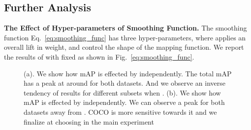 \documentclass[runningheads]{llncs}
\begin{document}
\begin{table}[t]
    \centering
    \caption{
    	Experimental results on re-sampling combined with several re-weighting techniques. CB loss with focal is reported by~\cite{cui2019cb} to perform better, so all the other techniques are enhanced with focal loss for fair comparison
    }
    \label{table:RS_plus_RW}
   \end{table} 
\subsection{Further Analysis}

\noindent\textbf{The Effect of Hyper-parameters of Smoothing Function.}
The smoothing function Eq.~\ref{eq:smoothing_func} has three hyper-parameters, where  applies an overall lift in weight,   and  control the shape of the mapping function. We report the results of  with  fixed as shown in Fig.~\ref{eq:smoothing_func}. 
\begin{figure}[t]
     \hfill
    \caption{
        (a). We show how mAP is effected by  independently. The total mAP has a peak at around  for both datasets. And we observe an inverse tendency of results for different subsets when .
        (b). We show how mAP is effected by  independently. We can observe a peak for both datasets away from . COCO is more sensitive towards it and we finalize at choosing  in the main experiment
    } 
\end{figure}
\end{document}
